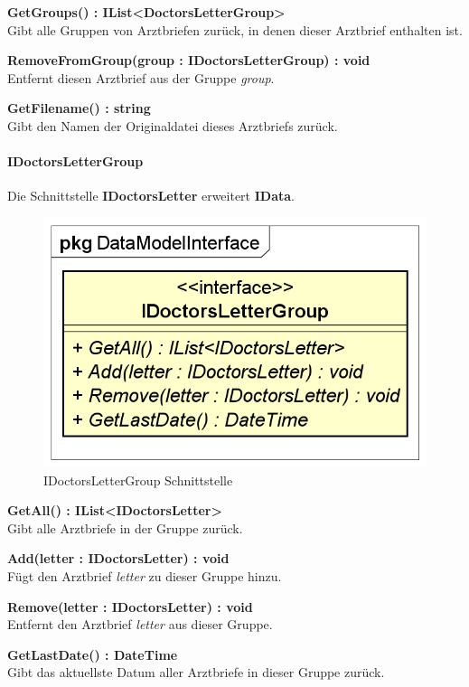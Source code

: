 \documentclass[a4paper]{scrreprt}
\begin{document}
\textbf{GetGroups() : IList<DoctorsLetterGroup>}\\
Gibt alle Gruppen von Arztbriefen zurück, in denen dieser Arztbrief enthalten ist.

\textbf{RemoveFromGroup(group : IDoctorsLetterGroup) : void}\\
Entfernt diesen Arztbrief aus der Gruppe \textit{group}.

\textbf{GetFilename() : string}\\
Gibt den Namen der Originaldatei dieses Arztbriefs zurück.

\paragraph{IDoctorsLetterGroup}
Die Schnittstelle \textbf{IDoctorsLetter} erweitert \textbf{IData}.

\begin{figure}[H]
\centering
\includegraphics[width=0.45\textheight]{graphics/Klassendiagramme/Model/IDoctorsLetterGroup.png}
\caption{IDoctorsLetterGroup Schnittstelle}
\end{figure}
\textbf{GetAll() : IList<IDoctorsLetter>}\\
Gibt alle Arztbriefe in der Gruppe zurück.

\textbf{Add(letter : IDoctorsLetter) : void}\\
Fügt den Arztbrief \textit{letter} zu dieser Gruppe hinzu.

\textbf{Remove(letter : IDoctorsLetter) : void}\\
Entfernt den Arztbrief \textit{letter} aus dieser Gruppe.

\textbf{GetLastDate() : DateTime}\\
Gibt das aktuellste Datum aller Arztbriefe in dieser Gruppe zurück.
\end{document}

